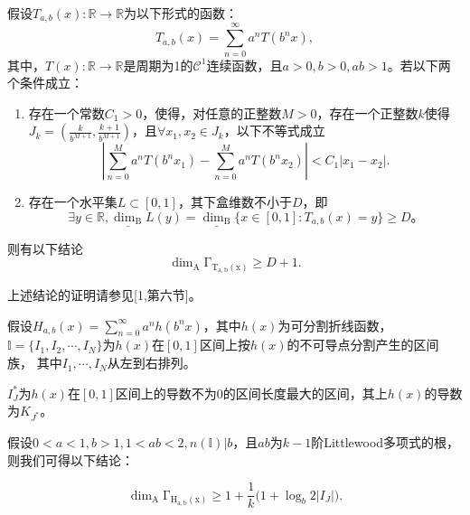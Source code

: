 \begin{lemma}
      假设$T_{a,b}(x):\mathbb{R}\rightarrow\mathbb{R}$为以下形式的函数：
      $$
            T_{a,b}(x)=\sum_{n=0}^\infty a^nT(b^nx),
      $$
      其中，$T(x):\mathbb{R}\rightarrow\mathbb{R}$是周期为1的$\mathcal{C}^1$连续函数，且$a>0,b>0,ab>1$。若以下两个条件成立：
      \begin{enumerate}
          \item 存在一个常数$C_1>0$，使得，对任意的正整数$M>0$，存在一个正整数$k$使得$J_k=(\frac{k}{b^{M+1}},\frac{k+1}{b^{M+1}})$，且$\forall x_1,x_2\in J_k$，以下不等式成立
          $$
                |\sum_{n=0}^Ma^nT(b^nx_1)-\sum_{n=0}^Ma^nT(b^nx_2)|<C_1|x_1-x_2|.
          $$
          \item 存在一个水平集$L\subset[0,1]$，其下盒维数不小于$D$，即
          $$
                \exists y\in\mathbb{R},\underline{\mathrm{\dim_B}}L(y)=\underline{\mathrm{\dim_B}}\{x\in[0,1]:T_{a,b}(x)=y\}\ge D。
          $$
      \end{enumerate}
      则有以下结论
      $$
        \mathrm{\dim_A\Gamma_{T_{a,b}(x)}}\ge D+1.
      $$
\end{lemma}

上述结论的证明请参见[1,第六节]。

假设$H_{a,b}(x)=\sum_{n=0}^\infty a^nh(b^nx)$，其中$h(x)$为可分割折线函数，
$\mathbb{I}=\{I_1,I_2,\cdots,I_N\}$为$h(x)$在$[0,1]$区间上按$h(x)$的不可导点分割产生的区间族，
其中$I_1,\cdots,I_N$从左到右排列。

$I_J^*$为$h(x)$在$[0,1]$区间上的导数不为$0$的区间长度最大的区间，其上$h(x)$的导数为$K_{J^*}$。

假设$0<a<1,b>1,1<ab<2,n(\mathbb{I})|b$，且$ab$为$k-1$阶Littlewood多项式的根，则我们可得以下结论：

$$
      \mathrm{\dim_A\Gamma_{H_{a,b}(x)}}\ge1+\frac{1}{k}\Big(1+\log_b2|I_J|\Big).
$$


